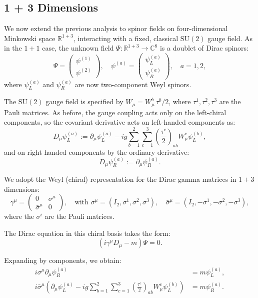 \documentclass[reqno,12pt,letterpaper]{amsart}
\numberwithin{equation}{section}
\newcommand{\1}{\mathds{1}}
\theoremstyle{definition}
\begin{document}
\subsection{1 + 3 Dimensions}\label{real_world_weak_example}

We now extend the previous analysis to spinor fields on four-dimensional Minkowski space \(\mathbb{R}^{1+3}\), interacting with a fixed, classical \(\mathrm{SU}(2)\) gauge field. As in the \(1+1\) case, the unknown field \(\Psi: \mathbb{R}^{1+3} \to \mathbb{C}^8\) is a doublet of Dirac spinors:
\[
\Psi = \begin{pmatrix} \psi^{(1)} \\ \psi^{(2)} \end{pmatrix}, \quad \psi^{(a)} = \begin{pmatrix} \psi_L^{(a)} \\ \psi_R^{(a)} \end{pmatrix}, \quad a = 1, 2,
\]
where \(\psi_L^{(a)}\) and \(\psi_R^{(a)}\) are now two-component Weyl spinors.

The \(\mathrm{SU}(2)\) gauge field is specified by \(W_\mu = W_\mu^b \, \tau^b / 2\), where \(\tau^1, \tau^2, \tau^3\) are the Pauli matrices. As before, the gauge coupling acts only on the left-chiral components, so the covariant derivative acts on left-handed components as:
\[
D_\mu \psi_L^{(a)} := \partial_\mu \psi_L^{(a)} - i g \sum_{b=1}^2 \sum_{c=1}^3 \left( \frac{\tau^c}{2} \right)_{ab} W_\mu^c \psi_L^{(b)},
\]
and on right-handed components by the ordinary derivative:
\[
D_\mu \psi_R^{(a)} := \partial_\mu \psi_R^{(a)}.
\]

We adopt the Weyl (chiral) representation for the Dirac gamma matrices in \(1+3\) dimensions:
\[
\gamma^\mu = \begin{pmatrix} 0 & \sigma^\mu \\ \bar{\sigma}^\mu & 0 \end{pmatrix}, \quad \text{with } \sigma^\mu = (I_2, \sigma^1, \sigma^2, \sigma^3), \quad \bar{\sigma}^\mu = (I_2, -\sigma^1, -\sigma^2, -\sigma^3),
\]
where the \(\sigma^i\) are the Pauli matrices.

The Dirac equation in this chiral basis takes the form:
\[
(i \gamma^\mu D_\mu - m) \Psi = 0.
\]

Expanding by components, we obtain:
\begin{align}
	i \sigma^\mu \partial_\mu \psi_R^{(a)} &= m \psi_L^{(a)}, \\
	i \bar{\sigma}^\mu \left( \partial_\mu \psi_L^{(a)} - i g \sum_{b=1}^2 \sum_{c=1}^3 \left( \frac{\tau^c}{2} \right)_{ab} W_\mu^c \psi_L^{(b)} \right) &= m \psi_R^{(a)}.
\end{align}
\end{document}
